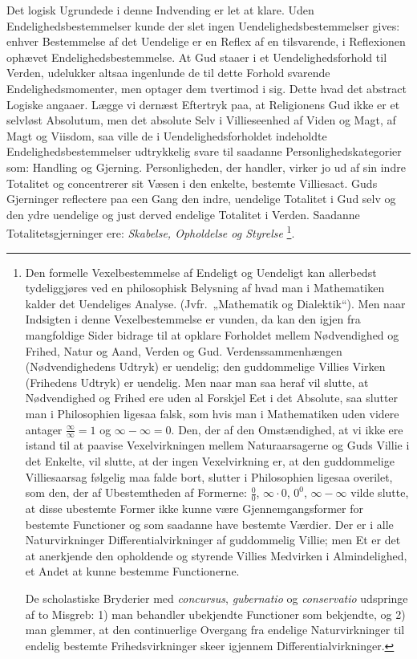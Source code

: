 \documentclass[12pt]{book}
\begin{document}
Det logisk Ugrundede i denne Indvending er let at klare. Uden
Endelighedsbestemmelser kunde der slet ingen
Uendelighedsbestemmelser gives: enhver Bestemmelse af det Uendelige
er en Reflex af en tilsvarende, i Reflexionen ophævet
Endelighedsbestemmelse. At Gud staaer i et Uendelighedsforhold til
Verden, udelukker altsaa ingenlunde de til dette Forhold svarende
Endelighedsmomenter, men optager dem tvertimod i sig. Dette hvad det
abstract Logiske angaaer. Lægge vi dernæst Eftertryk paa, at
Religionens Gud ikke er et selvløst Absolutum, men det absolute Selv
i Villieseenhed af Viden og Magt, af Magt og Viisdom, saa ville de i
Uendelighedsforholdet indeholdte Endelighedsbestemmelser udtrykkelig
svare til saadanne Personlighedskategorier som: Handling og
Gjerning. Personligheden, der handler, virker jo ud af sin indre
Totalitet og concentrerer sit Væsen i den enkelte, bestemte
Villiesact. Guds Gjerninger reflectere paa een Gang den indre,
uendelige Totalitet i Gud selv og den ydre uendelige og just derved
endelige Totalitet i Verden. Saadanne Totalitetsgjerninger ere:
\emph{Skabelse, Opholdelse og Styrelse}%
\footnote{Den formelle Vexelbestemmelse af Endeligt og Uendeligt kan
allerbedst tydeliggjøres ved en philosophisk Belysning af hvad man i
Mathematiken kalder det Uendeliges Analyse. (Jvfr.\ „Mathematik og
Dialektik“). Men naar Indsigten i denne Vexelbestemmelse er vunden,
da kan den igjen fra mangfoldige Sider bidrage til at opklare
Forholdet mellem Nødvendighed og Frihed, Natur og Aand, Verden og
Gud. Verdenssammenhængen (Nødvendighedens Udtryk) er uendelig; den
guddommelige Villies Virken (Frihedens Udtryk) er uendelig. Men naar
man saa heraf vil slutte, at Nødvendighed og Frihed ere uden al
Forskjel Eet i det Absolute, saa slutter man i Philosophien ligesaa
falsk, som hvis man i Mathematiken uden videre antager
$\frac{\infty}{\infty} = 1$ og $\infty - \infty = 0$. Den, der af
den Omstændighed, at vi ikke ere istand til at paavise
Vexelvirkningen mellem Naturaarsagerne og Guds Villie i det Enkelte,
vil slutte, at der ingen Vexelvirkning er, at den guddommelige
Villiesaarsag følgelig maa falde bort, slutter i Philosophien
ligesaa overilet, som den, der af Ubestemtheden af Formerne:
$\frac{0}{0}$, $\infty \cdot 0$, $0^{0}$, $\infty - \infty$ vilde
slutte, at disse ubestemte Former ikke kunne være
Gjennemgangsformer for bestemte Functioner og som saadanne have
bestemte Værdier. Der er i alle Naturvirkninger
Differentialvirkninger af guddommelig Villie; men Et er det at
anerkjende den opholdende og styrende Villies Medvirken i
Almindelighed, et Andet at kunne bestemme Functionerne.\par
De scholastiske Bryderier med \textit{concursus},
\textit{gubernatio} og \textit{conservatio} udspringe af to Misgreb:
1) man behandler ubekjendte Functioner som bekjendte, og 2) man
glemmer, at den continuerlige Overgang fra endelige Naturvirkninger
til endelig bestemte Frihedsvirkninger skeer igjennem
Differentialvirkninger.}.
\end{document}

